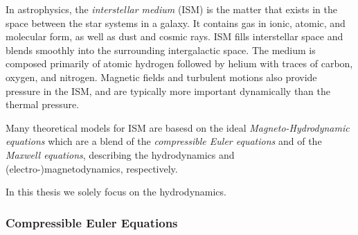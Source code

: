 
In astrophysics, the \emph{interstellar medium} (ISM) is the matter that exists
in the space between the star systems in a galaxy. It contains gas in ionic,
atomic, and molecular form, as well as dust and cosmic rays. ISM fills
interstellar space and blends smoothly into the surrounding intergalactic
space. The medium is composed primarily of atomic hydrogen followed by helium
with traces of carbon, oxygen, and nitrogen. Magnetic fields and turbulent
motions also provide pressure in the ISM, and are typically more important
dynamically than the thermal pressure.

Many theoretical models for ISM are basesd on the ideal
\emph{Magneto-Hydrodynamic equations} which are a blend of the \emph{compressible
Euler equations} and of the \emph{Maxwell equations}, describing the hydrodynamics
and (electro-)magnetodynamics, respectively.

In this thesis we solely focus on the hydrodynamics.

\subsubsection{Compressible Euler Equations}



